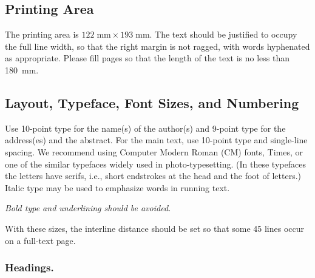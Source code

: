 \documentclass[runningheads]{llncs}
\begin{document}
\subsection{Printing Area}

The printing area is $122  \; \mbox{mm} \times 193 \;
\mbox{mm}$.
The text should be justified to occupy the full line width,
so that the right margin is not ragged, with words hyphenated as
appropriate. Please fill pages so that the length of the text
is no less than 180~mm.

\subsection{Layout, Typeface, Font Sizes, and Numbering}

Use 10-point type for the name(s) of the author(s) and 9-point type for
the address(es) and the abstract. For the main text, use 10-point
type and single-line spacing.
We recommend using Computer Modern Roman (CM) fonts, Times, or one
of the similar typefaces widely used in photo-typesetting.
(In these typefaces the letters have serifs, i.e., short endstrokes at
the head and the foot of letters.)
Italic type may be used to emphasize words in running text. 

{\it Bold
type and underlining should be avoided.}

With these sizes, the interline distance should be set so that some 45
lines occur on a full-text page.

\subsubsection{Headings.}
\end{document}
